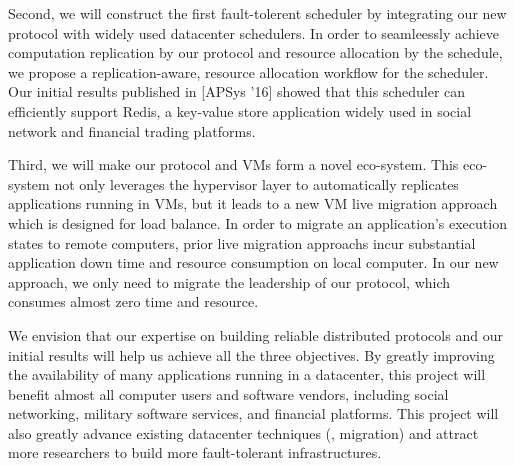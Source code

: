 
Second, we will construct the first fault-tolerent scheduler by integrating our 
new protocol with widely used datacenter schedulers. In order to seamleessly 
achieve computation replication by our protocol and resource allocation by the 
schedule, we propose a replication-aware, resource allocation workflow for the 
scheduler. Our initial results published in [APSys '16] showed that this 
scheduler can efficiently support Redis, a key-value store application widely 
used in social network and financial trading platforms.


Third, we will make our protocol and VMs form a novel eco-system. This 
eco-system not only leverages the hypervisor layer to automatically replicates 
applications running in VMs, but it leads to a new VM live migration approach 
which is designed for load balance. In order to migrate an application's 
execution states to remote computers, prior live migration approachs incur 
substantial application down time and resource consumption on local computer. In 
our new approach, we only need to migrate the leadership of our protocol, which 
consumes almost zero time and resource.


We envision that our expertise on building reliable distributed protocols and 
our initial results will help us achieve all the three objectives. By greatly 
improving the availability of many applications running in a datacenter, this 
project will benefit almost all computer users and software vendors, including 
social networking, military software services, and financial platforms. This 
project will also greatly advance existing datacenter techniques (\eg, 
migration) and attract more researchers to build more fault-tolerant 
infrastructures.


